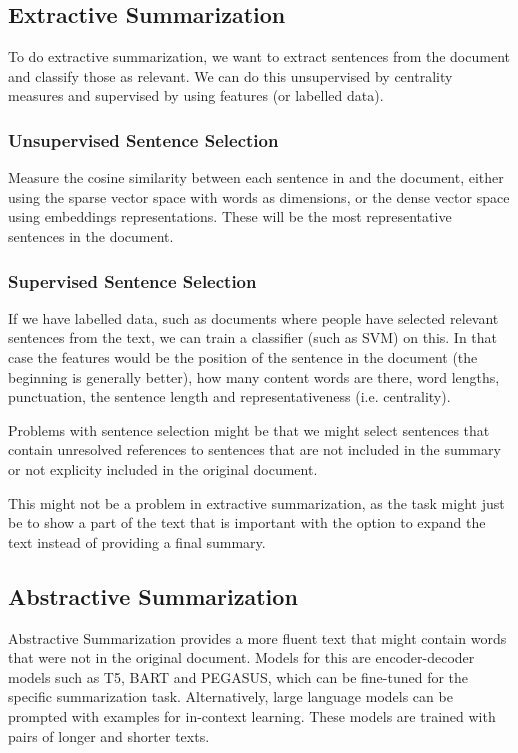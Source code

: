 \subsection{Extractive Summarization}

To do extractive summarization, we want to extract sentences from the
document and
classify those as relevant. We can do this unsupervised by centrality
measures and
supervised by using features (or labelled data).

\subsubsection{Unsupervised Sentence Selection}

Measure the cosine similarity between each sentence in and the document, either
using the sparse vector space with words as dimensions, or the dense
vector space
using embeddings representations. These will be the most
representative sentences
in the document.

\subsubsection{Supervised Sentence Selection}

If we have labelled data, such as documents where people have selected relevant
sentences from the text, we can train a classifier (such as SVM) on
this. In that
case the features would be the position of the sentence in the
document (the beginning is generally better),
how many content words are there, word lengths, punctuation, the
sentence length and
representativeness (i.e. centrality).

Problems with sentence selection might be that we might select sentences that
contain unresolved references to sentences that are not included in the summary
or not explicity included in the original document.

This might not be a problem in extractive summarization, as the task
might just be to show a part of the text that is important with the option
to expand the text instead of providing a final summary.

\subsection{Abstractive Summarization}

Abstractive Summarization provides a more fluent text that might contain words
that were not in the original document. Models for this are
encoder-decoder models
such as T5, BART and PEGASUS, which can be fine-tuned for the
specific summarization
task. Alternatively, large language models can be prompted with
examples for in-context
learning. These models are trained with pairs of longer and shorter texts.

